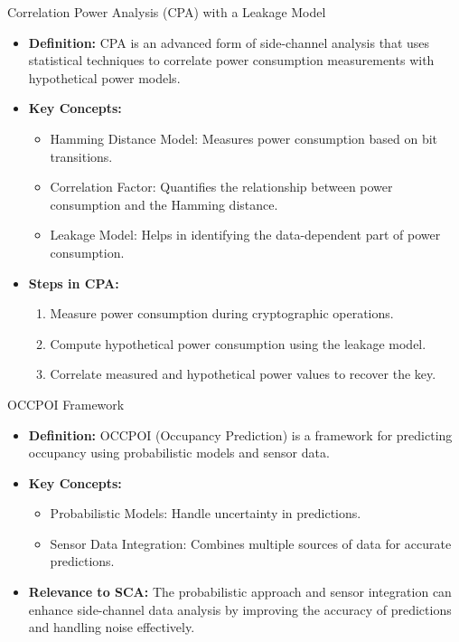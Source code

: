 \documentclass{beamer}
\begin{document}
\begin{frame}{Correlation Power Analysis (CPA) with a Leakage Model}
    \begin{itemize}
        \item \textbf{Definition:} CPA is an advanced form of side-channel analysis that uses statistical techniques to correlate power consumption measurements with hypothetical power models.
        \item \textbf{Key Concepts:}
        \begin{itemize}
            \item Hamming Distance Model: Measures power consumption based on bit transitions.
            \item Correlation Factor: Quantifies the relationship between power consumption and the Hamming distance.
            \item Leakage Model: Helps in identifying the data-dependent part of power consumption.
        \end{itemize}
        \item \textbf{Steps in CPA:}
        \begin{enumerate}
            \item Measure power consumption during cryptographic operations.
            \item Compute hypothetical power consumption using the leakage model.
            \item Correlate measured and hypothetical power values to recover the key.
        \end{enumerate}
    \end{itemize}
\end{frame}

\begin{frame}{OCCPOI Framework}
    \begin{itemize}
        \item \textbf{Definition:} OCCPOI (Occupancy Prediction) is a framework for predicting occupancy using probabilistic models and sensor data.
        \item \textbf{Key Concepts:}
        \begin{itemize}
            \item Probabilistic Models: Handle uncertainty in predictions.
            \item Sensor Data Integration: Combines multiple sources of data for accurate predictions.
        \end{itemize}
        \item \textbf{Relevance to SCA:} The probabilistic approach and sensor integration can enhance side-channel data analysis by improving the accuracy of predictions and handling noise effectively.
    \end{itemize}
\end{frame}
\end{document}
